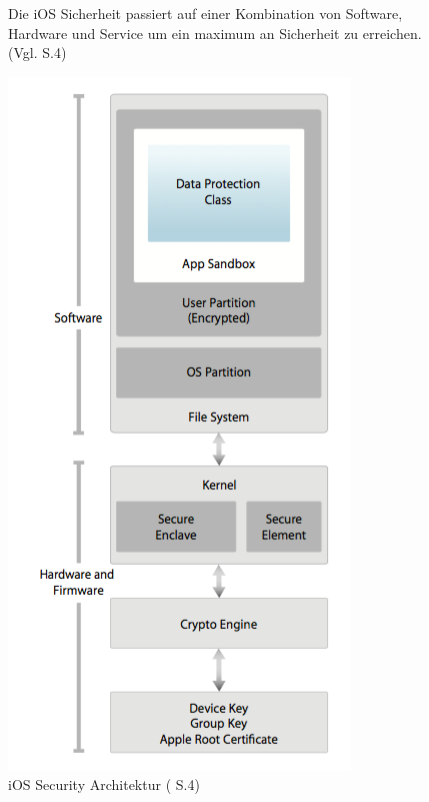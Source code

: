\begin{figure}[htb]
\begin{minipage}{0.6\textwidth}
Die iOS Sicherheit passiert auf einer Kombination von Software, Hardware und Service um ein maximum an Sicherheit zu erreichen. (Vgl. \cite{Apple[4]} S.4)
	\end{minipage}
	\hfil
	\begin{minipage}{0.4\textwidth}
		\includegraphics[width=\textwidth]{Bilder/Chapter3_SecArchitektur}
		\caption {iOS Security Architektur (\cite{Apple[4]} S.4)}
        \label{fig:iOS Security Architektur}
	\end{minipage}
\end{figure}
		    	
